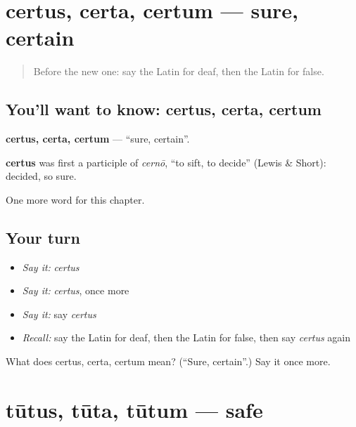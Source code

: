 \section[certus, certa, certum]{certus, certa, certum — sure, certain}

\label{lesson:LA-C147-certus}



\begin{quote}
Before the new one: say the Latin for deaf, then the Latin for false.
\end{quote}

\subsection*{You'll want to know: certus, certa, certum}
\textbf{certus, certa, certum} — \textquotedblleft{}sure, certain\textquotedblright{}.

\begin{cousinweb}
\textbf{certus} was first a participle of \emph{cernō}, \textquotedblleft{}to sift, to decide\textquotedblright{} (Lewis \& Short): decided, so sure.
\end{cousinweb}

\begin{grammarlens}[title={What you've built}]
One more word for this chapter.
\end{grammarlens}

\subsection*{Your turn}
\begin{itemize}
\raggedright
  \item \emph{Say it:} \emph{certus}
  \item \emph{Say it:} \emph{certus}, once more
  \item \emph{Say it:} say \emph{certus}
  \item \emph{Recall:} say the Latin for deaf, then the Latin for false, then say \emph{certus} again
\end{itemize}

\begin{tcolorbox}[breakable,colback=teal!4,colframe=teal!35!black,title={Before you move on}]
What does certus, certa, certum mean? (\textquotedblleft{}Sure, certain\textquotedblright{}.) Say it once more.
\end{tcolorbox}
\section[tūtus, tūta, tūtum]{tūtus, tūta, tūtum — safe}

